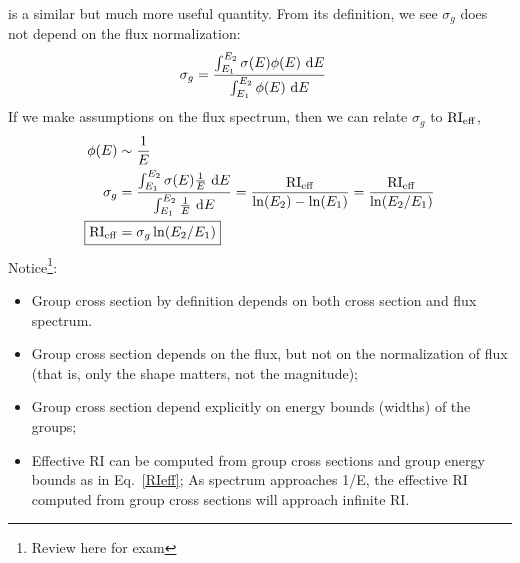 \documentclass{school-22.211-notes}
\begin{document}
 is a similar but much more useful quantity. From its definition, we see $\sigma_g$ does not depend on the flux normalization: 
\begin{align}
\sigma_g &= \frac{\int_{E_1}^{E_2} \sigma(E) \phi(E) \mbox{ }\mathrm{d} E }{\int_{E_1}^{E_2} \phi(E) \mbox{ }\mathrm{d} E} 
\end{align}
If we make assumptions on the flux spectrum, then we can relate $\sigma_g$ to $\mathrm{RI}_{\mathrm{eff}}$,
\begin{align}
\phi(E) &\sim \frac{1}{E} \\
\sigma_g &= \frac{\int_{E_1}^{E_2} \sigma(E) \frac{1}{E} \dE }{\int_{E_1}^{E_2} \frac{1}{E} \dE} 
= \frac{\RI_{\eff}}{\ln(E_2) - \ln(E_1)}  
= \frac{\RI_{\eff}}{\ln(E_2/E_1)} \\
\Aboxed{\RI_{\eff} &= \sigma_g \ln(E_2/E_1) } \label{RIeff}
\end{align}
Notice\footnote{Review here for exam}:
\begin{itemize}
\item Group cross section by definition depends on both cross section and flux spectrum. 
\item Group cross section depends on the flux, but not on the normalization of flux (that is, only the shape matters, not the magnitude);
\item Group cross section depend explicitly on energy bounds (widths) of the groups; 
\item Effective RI can be computed from group cross sections and group energy bounds as in Eq.~\ref{RIeff}; As spectrum approaches 1/E, the effective RI computed from group cross sections will approach infinite RI. 
\end{itemize}
\end{document}
